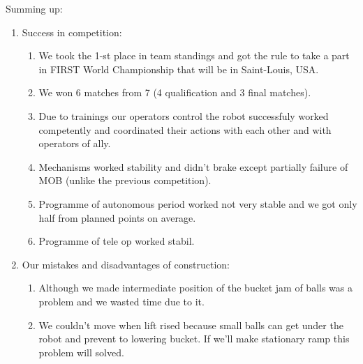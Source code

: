 Summing up:
\begin{enumerate}
	\item Success in competition:
	\begin{enumerate}
		\item We took the 1-st place in team standings and got the rule to take a part in FIRST World Championship that will be in Saint-Louis, USA.
		
		\item We won 6 matches from 7 (4 qualification and 3 final matches).
		
		\item Due to trainings our operators control the robot successfuly worked competently and coordinated their actions with each other and with operators of ally.
		
		\item Mechanisms worked stability and didn't brake except partially failure of MOB (unlike the previous competition).
		
		\item Programme of autonomous period worked not very stable and we got only half from planned points  on average.
		
		\item Programme of tele op worked stabil.
		
	\end{enumerate}
	
	\item Our mistakes and disadvantages of construction:
	\begin{enumerate}
		\item Although we made intermediate position of the bucket jam of balls was a problem and we wasted time due to it.
		
		\item We couldn't move when lift rised because small balls can get under the robot and prevent to lowering bucket. If we'll make stationary ramp this problem will solved.
		
	\end{enumerate}
	

\end{enumerate}
